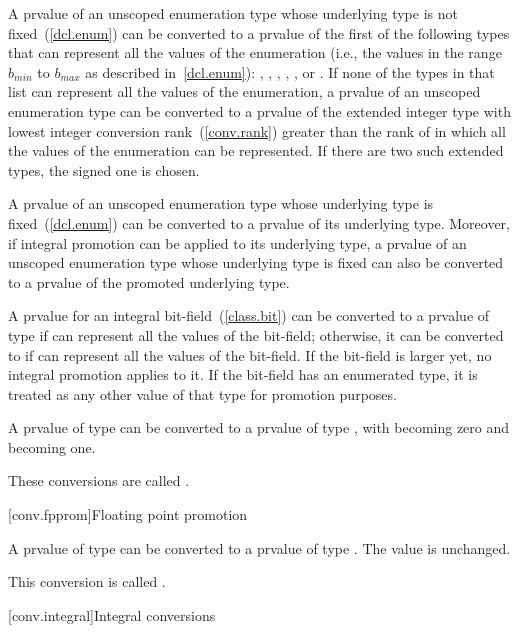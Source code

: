 \pnum
A prvalue of an unscoped enumeration type whose underlying type is not
fixed~(\ref{dcl.enum}) can be converted to a prvalue of the first of the following
types that can represent all the values of the enumeration (i.e., the values in the
range $b_\mathit{min}$ to $b_\mathit{max}$ as described in~\ref{dcl.enum}): ,
,  ,  ,
, or . If none of the types in that
list can represent all the values of the enumeration, a prvalue of an unscoped
enumeration type can be converted to a prvalue of the extended integer type with lowest
integer conversion rank~(\ref{conv.rank}) greater than the rank of 
 in which all the values of the enumeration can be represented. If there are
two such extended types, the signed one is chosen.

\pnum
A prvalue of an unscoped enumeration type whose underlying type is
fixed~(\ref{dcl.enum}) can be converted to a prvalue of its underlying type. Moreover,
if integral promotion can be applied to its underlying type, a prvalue of an unscoped
enumeration type whose underlying type is fixed can also be converted to a prvalue of
the promoted underlying type.

\pnum
A prvalue for an integral bit-field~(\ref{class.bit}) can be converted
to a prvalue of type  if  can represent all the
values of the bit-field; otherwise, it can be converted to
 if  can represent all the
values of the bit-field. If the bit-field is larger yet, no integral
promotion applies to it. If the bit-field has an enumerated type, it is
treated as any other value of that type for promotion purposes.

\pnum
{}%
A prvalue of type  can be converted to a prvalue of type
, with  becoming zero and  becoming
one.

\pnum
These conversions are called .

[conv.fpprom]{Floating point promotion}

\pnum
{}%
A prvalue of type  can be converted to a prvalue of type
. The value is unchanged.

\pnum
This conversion is called .

[conv.integral]{Integral conversions}

